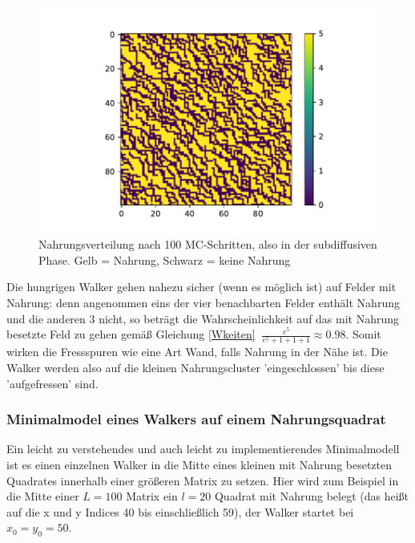 \documentclass[a4paper, 12pt]{scrartcl}
\begin{document}
\begin{figure}[H]
	\centering
	\includegraphics[scale=0.8]{usedmat.pdf}
	\caption{Nahrungsverteilung nach 100 MC-Schritten, also in der subdiffusiven Phase. Gelb = Nahrung, Schwarz = keine Nahrung}
\end{figure}


\noindent Die hungrigen Walker gehen nahezu sicher (wenn es möglich ist) auf Felder mit Nahrung: denn angenommen eins der vier benachbarten Felder enthält Nahrung und die anderen 3 nicht, so beträgt die Wahrscheinlichkeit auf das mit Nahrung besetzte Feld zu gehen gemäß Gleichung \ref{Wkeiten} $\ \frac{e^5}{e^5 + 1+ 1+1} \approx 0.98$. Somit wirken die Fressspuren wie eine Art Wand, falls Nahrung in der Nähe ist. Die Walker werden also auf die kleinen Nahrungscluster 'eingeschlossen' bis diese 'aufgefressen' sind.


\subsubsection{Minimalmodel eines Walkers auf einem Nahrungsquadrat}\label{minimalmodell}
Ein leicht zu verstehendes und auch leicht zu implementierendes Minimalmodell ist es einen einzelnen Walker in die Mitte eines kleinen mit Nahrung besetzten Quadrates innerhalb einer größeren Matrix zu setzen. Hier wird zum Beispiel in die Mitte einer $L=100$ Matrix ein $l=20$ Quadrat mit Nahrung belegt (das heißt auf die x und y Indices 40 bis einschließlich 59), der Walker startet bei $x_0=y_0=50$.
\end{document}
